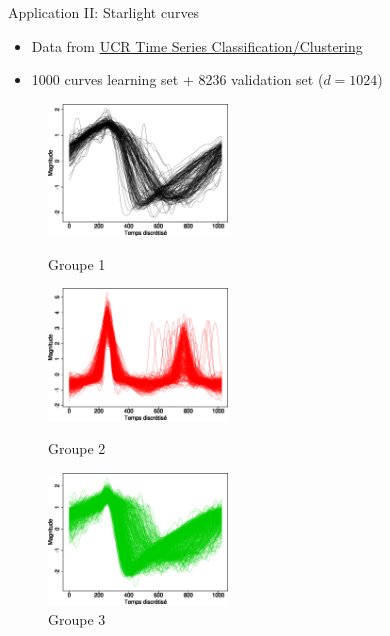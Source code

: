 \begin{frame}{Application II: Starlight curves}

\begin{itemize}
 \item Data from \href{http://www.cs.ucr.edu/~eamonn/time_series_data/}{UCR Time Series Classification/Clustering}
 \item 1000 curves learning set + 8236 validation set ($d = 1024$)%
\end{itemize}

\begin{figure}[H]
\begin{minipage}[c]{.32\linewidth}
	\includegraphics[width=\linewidth,height=3.5cm]{pics/slgr1.png}
	\vspace*{-0.35cm}
	\caption{Groupe 1}
\end{minipage}
\begin{minipage}[c]{.32\linewidth}
	\includegraphics[width=\linewidth,height=3.5cm]{pics/slgr2.png}
	\vspace*{-0.35cm}
	\caption{Groupe 2}
\end{minipage}
\begin{minipage}[c]{.32\linewidth}
	\includegraphics[width=\linewidth,height=3.5cm]{pics/slgr3.png}
	\vspace*{-0.35cm}
	\caption{Groupe 3}
\end{minipage}
\end{figure}


\end{frame}
